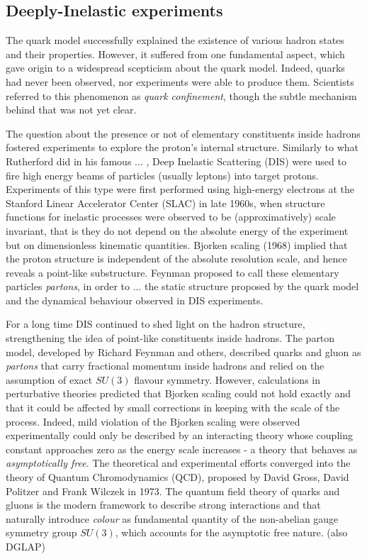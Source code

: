 \subsection*{Deeply-Inelastic experiments}

The quark model successfully explained the existence of various hadron states and their properties. However, it suffered from one fundamental aspect, which gave origin to a widespread scepticism about the quark model. Indeed, quarks had never been observed, nor experiments were able to produce them. Scientists referred to this phenomenon as \textit{quark confinement}, though the subtle mechanism behind that was not yet clear.

The question about the presence or not of elementary constituents inside hadrons fostered experiments to explore the proton's internal structure. Similarly to what Rutherford did in his famous ... , Deep Inelastic Scattering (DIS) were used to fire high energy beams of particles (usually leptons) into target protons. Experiments of this type were first performed using high-energy electrons at the Stanford Linear Accelerator Center (SLAC) in late 1960s, when structure functions for inelastic processes were observed to be (approximatively) scale invariant, that is they do not depend on the absolute energy of the experiment but on dimensionless kinematic quantities. Bjorken scaling (1968) implied that the proton structure is independent of the absolute resolution scale, and hence reveals a point-like substructure. Feynman proposed to call these elementary particles \textit{partons}, in order to ... the static structure proposed by the quark model and the dynamical behaviour observed in DIS experiments.%

For a long time DIS continued to shed light on the hadron structure, strengthening the idea of point-like constituents inside hadrons. The parton model, developed by Richard Feynman and others, described quarks and gluon as \textit{partons} that carry fractional momentum inside hadrons and relied on the assumption of exact $SU(3)$ flavour symmetry. However, calculations in perturbative theories predicted that Bjorken scaling could not hold exactly and that it could be affected by small corrections in keeping with the scale of the process. Indeed, mild violation of the Bjorken scaling were observed experimentally could only be described by an interacting theory whose coupling constant approaches zero as the energy scale increases - a theory that behaves as \textit{asymptotically free}. The theoretical and experimental efforts converged into the theory of Quantum Chromodynamics (QCD), proposed by David Gross, David Politzer and Frank Wilczek in 1973. The quantum field theory of quarks and gluons is the modern framework to describe strong interactions and that naturally introduce \textit{colour} as fundamental quantity of the non-abelian gauge symmetry group $SU(3)$, which accounts for the asymptotic free nature. (also DGLAP)
